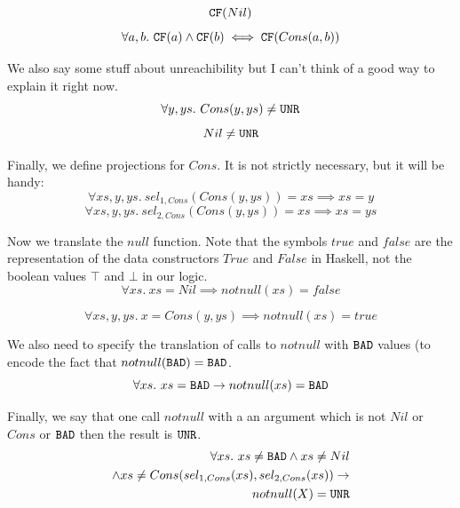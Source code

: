 \documentclass[preprint]{sigplanconf}
\begin{document}
\begin{equation*}
\texttt{CF}(Nil)
\end{equation*}
\begin{equation}
  \label{cfcons}
\forall a,b.~\texttt{CF}(a) \land \texttt{CF}(b) \iff \texttt{CF}(Cons(a,b))
\end{equation}

We also say some stuff about unreachibility but I can't think of a
good way to explain it right now.
\begin{equation*}
\forall y,ys.~Cons(y,ys) \neq \texttt{UNR} 
\end{equation*}
\begin{equation*}
Nil \neq \texttt{UNR} 
\end{equation*}

Finally, we define projections for $Cons$. It is not strictly
necessary, but it will be handy:
\begin{equation*}
\forall xs,y,ys.~sel_{1,Cons}(Cons(y,ys)) = xs \implies xs = y 
\end{equation*}
\begin{equation*}
\forall xs,y,ys.~sel_{2,Cons}(Cons(y,ys)) = xs \implies xs = ys 
\end{equation*}

Now we translate the $null$ function. Note that the symbols $true$ and
$false$ are the representation of the data constructors $True$ and
$False$ in Haskell, not the boolean values $\top$ and $\bot$ in our
logic.
\begin{equation*}
\forall xs.~ xs=Nil \implies notnull(xs) = false
\end{equation*}

\begin{equation}
  \label{defnotnull}
\forall xs,y,ys.~ x=Cons(y,ys) \implies notnull(xs) = true
\end{equation}

We also need to specify the translation of calls to $notnull$ with
$\texttt{BAD}$ values (to encode the fact that $notnull(\texttt{BAD}) = \texttt{BAD}$.
\begin{equation*}
\forall xs.~xs=\texttt{BAD} \to notnull(xs) = \texttt{BAD}
\end{equation*}

Finally, we say that one call $notnull$ with a an argument which is
not $Nil$ or $Cons$ or $\texttt{BAD}$ then the result is $\texttt{UNR}$.
\begin{align}
  \label{unrnotnull}
  \forall xs.~xs \neq \texttt{BAD} \land xs \neq Nil  \notag \\
  \land xs \neq Cons(sel_{1,Cons}(xs),sel_{2,Cons}(xs)) \to  \notag \\
  notnull(X) = \texttt{UNR} 
\end{align}
\end{document}

